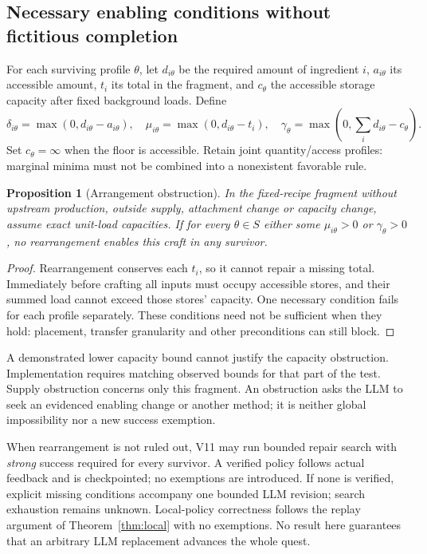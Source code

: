 \documentclass[11pt]{article}
\newtheorem{proposition}[theorem]{Proposition}
\theoremstyle{definition}
\begin{document}
\subsection{Necessary enabling conditions without fictitious completion}
For each surviving profile $\theta$, let $d_{i\theta}$ be the required amount
of ingredient $i$, $a_{i\theta}$ its accessible amount, $t_i$ its total in the
fragment, and $c_\theta$ the accessible storage capacity after fixed background
loads. Define
\[
 \delta_{i\theta}=\max(0,d_{i\theta}-a_{i\theta}),\quad
 \mu_{i\theta}=\max(0,d_{i\theta}-t_i),\quad
 \gamma_\theta=\max(0,\textstyle\sum_i d_{i\theta}-c_\theta).
\]
Set $c_\theta=\infty$ when the floor is accessible. Retain joint quantity/access
profiles: marginal minima must not be combined into a nonexistent favorable rule.
\begin{proposition}[Arrangement obstruction]\label{prop:obstruction}
In the fixed-recipe fragment without upstream production, outside supply,
attachment change or capacity change, assume exact unit-load capacities.
If for every $\theta\in S$ either some $\mu_{i\theta}>0$ or
$\gamma_\theta>0$, no rearrangement enables this craft in any survivor.
\end{proposition}
\begin{proof}
Rearrangement conserves each $t_i$, so it cannot repair a missing total.
Immediately before crafting all inputs must occupy accessible stores, and their
summed load cannot exceed those stores' capacity. One necessary condition fails
for each profile separately. These conditions need not be sufficient when they
hold: placement, transfer granularity and other preconditions can still block.
\end{proof}
A demonstrated lower capacity bound cannot justify the capacity obstruction.
Implementation requires matching observed bounds for that part of the test.
Supply obstruction concerns only this fragment. An obstruction asks the LLM to
seek an evidenced enabling change or another method; it is neither global
impossibility nor a new success exemption.

When rearrangement is not ruled out, V11 may run bounded repair search with
\emph{strong} success required for every survivor. A verified policy follows
actual feedback and is checkpointed; no exemptions are introduced. If none is
verified, explicit missing conditions accompany one bounded LLM revision;
search exhaustion remains unknown. Local-policy correctness follows the replay
argument of Theorem~\ref{thm:local} with no exemptions. No result here guarantees
that an arbitrary LLM replacement advances the whole quest.
\end{document}
